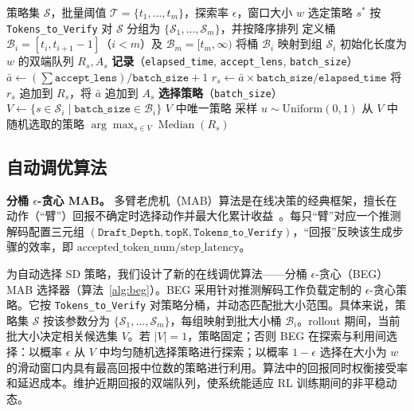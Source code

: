 \documentclass[10pt,twocolumn]{article}
\begin{document}
\begin{algorithm}[t]
\small
\caption{分桶 $\epsilon$-贪心（BEG）MAB 选择器}
\label{alg:beg}
\begin{algorithmic}[1]
\Require 策略集 $\mathcal S$，批量阈值 $\mathcal T=\{t_1,\ldots,t_m\}$，探索率 $\epsilon$，窗口大小 $w$
\Ensure 选定策略 $s^*$
\State 按 \texttt{Tokens\_to\_Verify} 对 $\mathcal S$ 分组为 $\{\mathcal S_1,\ldots,\mathcal S_m\}$，并按降序排列
\State 定义桶 $\mathcal B_i=[t_i,t_{i+1}-1]$（$i<m$）及 $\mathcal B_m=[t_m,\infty)$
\State 将桶 $\mathcal B_i$ 映射到组 $\mathcal S_i$
  \State 初始化长度为 $w$ 的双端队列 $R_s,A_s$
\EndFor
\Statex \textbf{记录}（\texttt{elapsed\_time}, \texttt{accept\_lens}, \texttt{batch\_size}）
\State $\bar a\gets(\sum\texttt{accept\_lens})/\texttt{batch\_size}+1$
\State $r_s\gets\bar a\times\texttt{batch\_size}/\texttt{elapsed\_time}$
\State 将 $r_s$ 追加到 $R_s$，将 $\bar a$ 追加到 $A_s$
\Statex \textbf{选择策略}（\texttt{batch\_size}）
\State $V\gets\{s\in\mathcal S_i\mid\texttt{batch\_size}\in\mathcal B_i\}$
 \State \Return $V$ 中唯一策略 \EndIf
\State 采样 $u\sim\mathrm{Uniform}(0,1)$
  \State \Return 从 $V$ 中随机选取的策略 
\Else
  \State \Return $\arg\max_{s\in V}\operatorname{Median}(R_s)$ 
\EndIf
\end{algorithmic}
\end{algorithm}

\subsection{自动调优算法}

\noindent\textbf{分桶 $\epsilon$-贪心 MAB。}
多臂老虎机（MAB）算法是在线决策的经典框架，擅长在动作（“臂”）回报不确定时选择动作并最大化累计收益~\cite{MABResourceAllocation,MAB}。每只“臂”对应一个推测解码配置三元组 $(\texttt{Draft\_Depth},\texttt{topK},\texttt{Tokens\_to\_Verify})$，“回报”反映该生成步骤的效率，即 $\text{accepted\_token\_num}/\text{step\_latency}$。

为自动选择 SD 策略，我们设计了新的在线调优算法——分桶 $\epsilon$-贪心（BEG）MAB 选择器（算法~\ref{alg:beg}）。BEG 采用针对推测解码工作负载定制的 $\epsilon$-贪心策略。它按 \texttt{Tokens\_to\_Verify} 对策略分桶，并动态匹配批大小范围。具体来说，策略集 $\mathcal S$ 按该参数分为 $\{\mathcal S_1,\ldots,\mathcal S_m\}$，每组映射到批大小桶 $\mathcal B_i$。rollout 期间，当前批大小决定相关候选集 $V$。若 $|V|=1$，策略固定；否则 BEG 在探索与利用间选择：以概率 $\epsilon$ 从 $V$ 中均匀随机选择策略进行探索；以概率 $1-\epsilon$ 选择在大小为 $w$ 的滑动窗口内具有最高回报中位数的策略进行利用。算法中的回报同时权衡接受率和延迟成本。维护近期回报的双端队列，使系统能适应 RL 训练期间的非平稳动态。
\end{document}
